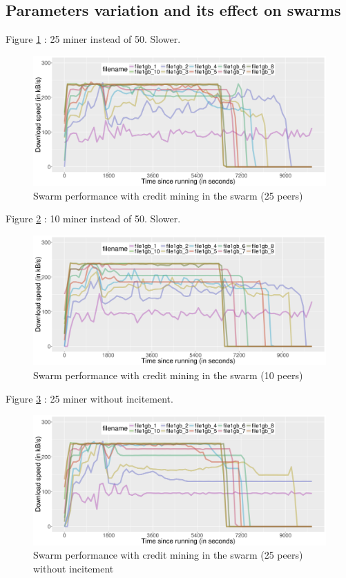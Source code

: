 \subsection{Parameters variation and its effect on swarms}

Figure \ref{fig:swarmcm25perf} : 25 miner instead of 50. Slower.

\begin{figure}[h!]
	\centering
	\includegraphics[width=\textwidth]{pics/results/swperf_sc2_25.png}
	\caption{Swarm performance with credit mining in the swarm (25 peers)}
	\label{fig:swarmcm25perf}
\end{figure}

Figure \ref{fig:swarmcm10perf} : 10 miner instead of 50. Slower.

\begin{figure}[h!]
	\centering
	\includegraphics[width=\textwidth]{pics/results/swperf_sc1_10.png}
	\caption{Swarm performance with credit mining in the swarm (10 peers)}
	\label{fig:swarmcm10perf}
\end{figure}

Figure \ref{fig:swarmcm25perfnotrig} : 25 miner without incitement.

\begin{figure}[h!]
	\centering
	\includegraphics[width=\textwidth]{pics/results/swperf_sc1_notrig.png}
	\caption{Swarm performance with credit mining in the swarm (25 peers) without incitement}
	\label{fig:swarmcm25perfnotrig}
\end{figure}

